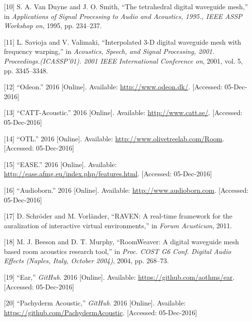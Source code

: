 \documentclass[]{scrreprt}
\begin{document}
\hypertarget{ref-vanux5fduyneux5ftetrahedralux5f1995}{}
{[}10{]} S. A. Van Duyne and J. O. Smith, ``The tetrahedral digital
waveguide mesh,'' in \emph{Applications of Signal Processing to Audio
and Acoustics, 1995., IEEE ASSP Workshop on}, 1995, pp. 234--237.

\hypertarget{ref-saviojaux5finterpolatedux5f2001}{}
{[}11{]} L. Savioja and V. Valimaki, ``Interpolated 3-D digital
waveguide mesh with frequency warping,'' in \emph{Acoustics, Speech, and
Signal Processing, 2001. Proceedings.(ICASSP'01). 2001 IEEE
International Conference on}, 2001, vol. 5, pp. 3345--3348.

\hypertarget{ref-ux5fodeonux5f2016}{}
{[}12{]} ``Odeon.'' 2016 {[}Online{]}. Available:
\url{http://www.odeon.dk/}. {[}Accessed: 05-Dec-2016{]}

\hypertarget{ref-ux5fcatt-acousticux5f2016}{}
{[}13{]} ``CATT-Acoustic.'' 2016 {[}Online{]}. Available:
\url{http://www.catt.se/}. {[}Accessed: 05-Dec-2016{]}

\hypertarget{ref-ux5fotlux5f2016}{}
{[}14{]} ``OTL.'' 2016 {[}Online{]}. Available:
\url{http://www.olivetreelab.com/Room}. {[}Accessed: 05-Dec-2016{]}

\hypertarget{ref-ux5feaseux5f2016}{}
{[}15{]} ``EASE.'' 2016 {[}Online{]}. Available:
\url{http://ease.afmg.eu/index.php/features.html}. {[}Accessed:
05-Dec-2016{]}

\hypertarget{ref-ux5faudiobornux5f2016}{}
{[}16{]} ``Audioborn.'' 2016 {[}Online{]}. Available:
\url{http://www.audioborn.com}. {[}Accessed: 05-Dec-2016{]}

\hypertarget{ref-schroderux5fraven:ux5f2011}{}
{[}17{]} D. Schröder and M. Vorländer, ``RAVEN: A real-time framework
for the auralization of interactive virtual environments,'' in
\emph{Forum Acusticum}, 2011.

\hypertarget{ref-beesonux5froomweaver:ux5f2004}{}
{[}18{]} M. J. Beeson and D. T. Murphy, ``RoomWeaver: A digital
waveguide mesh based room acoustics research tool,'' in \emph{Proc. COST
G6 Conf. Digital Audio Effects (Naples, Italy, October 2004)}, 2004, pp.
268--73.

\hypertarget{ref-ux5fearux5f2016}{}
{[}19{]} ``Ear,'' \emph{GitHub}. 2016 {[}Online{]}. Available:
\url{https://github.com/aothms/ear}. {[}Accessed: 05-Dec-2016{]}

\hypertarget{ref-ux5fpachydermux5f2016}{}
{[}20{]} ``Pachyderm Acoustic,'' \emph{GitHub}. 2016 {[}Online{]}.
Available: \url{https://github.com/PachydermAcoustic}. {[}Accessed:
05-Dec-2016{]}
\end{document}
